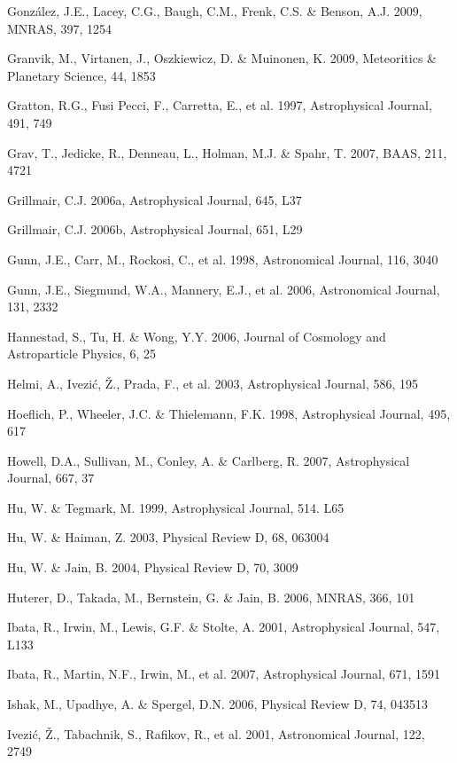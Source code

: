 \documentclass{emulateapj}
\begin{document}
\begin{thebibliography}{}
\bibitem[()]{} Gonz\'{a}lez, J.E., Lacey, C.G., Baugh, C.M., Frenk, C.S. \& Benson, A.J. 2009, MNRAS, 397, 1254

\bibitem[()]{} Granvik, M., Virtanen, J., Oszkiewicz, D. \& Muinonen, K. 2009, Meteoritics \& Planetary Science, 44, 1853

\bibitem[()]{} Gratton, R.G., Fusi Pecci, F., Carretta, E., et al. 1997, Astrophysical Journal, 491, 749

\bibitem[()]{} Grav, T., Jedicke, R., Denneau, L., Holman, M.J.  \& Spahr, T. 2007, BAAS, 211, 4721

\bibitem[()]{} Grillmair, C.J. 2006a, Astrophysical Journal, 645, L37

\bibitem[()]{} Grillmair, C.J. 2006b, Astrophysical Journal, 651, L29

\bibitem[()]{} Gunn, J.E., Carr, M., Rockosi, C., et al. 1998, Astronomical Journal, 116, 3040

\bibitem[()]{} Gunn, J.E., Siegmund, W.A., Mannery, E.J., et al. 2006, Astronomical Journal, 131, 2332

\bibitem[()]{} Hannestad, S., Tu, H. \& Wong, Y.Y. 2006, Journal of Cosmology and Astroparticle 
             Physics, 6, 25

\bibitem[()]{} Helmi, A., Ivezi\'{c}, \v{Z}., Prada, F., et al. 2003, Astrophysical Journal, 586, 195

\bibitem[()]{} Hoeflich, P., Wheeler, J.C. \& Thielemann, F.K. 1998, Astrophysical Journal, 495, 617

\bibitem[()]{} Howell, D.A., Sullivan, M., Conley, A. \& Carlberg, R. 2007, Astrophysical Journal, 667, 37

\bibitem[()]{} Hu, W. \& Tegmark, M. 1999, Astrophysical Journal, 514. L65

\bibitem[()]{} Hu, W. \& Haiman, Z. 2003, Physical Review D, 68, 063004

\bibitem[()]{} Hu, W. \& Jain, B. 2004, Physical Review D, 70, 3009

\bibitem[()]{} Huterer, D., Takada, M., Bernstein, G. \& Jain, B. 2006, MNRAS, 366, 101
	
\bibitem[()]{} Ibata, R., Irwin, M., Lewis, G.F. \& Stolte, A. 2001, Astrophysical Journal, 547, L133
	
\bibitem[()]{} Ibata, R., Martin, N.F., Irwin, M., et al. 2007, Astrophysical Journal, 671, 1591

\bibitem[()]{} Ishak, M., Upadhye, A. \& Spergel, D.N. 2006, Physical Review D, 74, 043513

\bibitem[()]{} Ivezi\'{c}, \v{Z}., Tabachnik, S., Rafikov, R., et al. 2001, Astronomical Journal, 122, 2749
	

\end{thebibliography}
\end{document}
